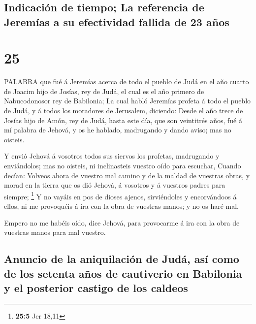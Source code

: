 \hypertarget{indicaciuxf3n-de-tiempo-la-referencia-de-jeremuxedas-a-su-efectividad-fallida-de-23-auxf1os}{%
\subsection{Indicación de tiempo; La referencia de Jeremías a su
efectividad fallida de 23
años}\label{indicaciuxf3n-de-tiempo-la-referencia-de-jeremuxedas-a-su-efectividad-fallida-de-23-auxf1os}}

\hypertarget{section-24}{%
\section{25}\label{section-24}}

 PALABRA que fué á Jeremías acerca de todo el pueblo de Judá
en el año cuarto de Joacim hijo de Josías, rey de Judá, el cual es el
año primero de Nabucodonosor rey de Babilonia;  La cual
habló Jeremías profeta á todo el pueblo de Judá, y á todos los moradores
de Jerusalem, diciendo:  Desde el año trece de Josías hijo
de Amón, rey de Judá, hasta este día, que son veintitrés años, fué á mí
palabra de Jehová, y os he hablado, madrugando y dando aviso; mas no
oisteis.

 Y envió Jehová á vosotros todos sus siervos los profetas,
madrugando y enviándolos; mas no oisteis, ni inclinasteis vuestro oído
para escuchar,  Cuando decían: Volveos ahora de vuestro mal
camino y de la maldad de vuestras obras, y morad en la tierra que os dió
Jehová, á vosotros y á vuestros padres para siempre; \footnote{\textbf{25:5}
  Jer 18,11}  Y no vayáis en pos de dioses ajenos,
sirviéndoles y encorvándoos á ellos, ni me provoquéis á ira con la obra
de vuestras manos; y no os haré mal.

 Empero no me habéis oído, dice Jehová, para provocarme á
ira con la obra de vuestras manos para mal vuestro.

\hypertarget{anuncio-de-la-aniquilaciuxf3n-de-juduxe1-asuxed-como-de-los-setenta-auxf1os-de-cautiverio-en-babilonia-y-el-posterior-castigo-de-los-caldeos}{%
\subsection{Anuncio de la aniquilación de Judá, así como de los setenta
años de cautiverio en Babilonia y el posterior castigo de los
caldeos}\label{anuncio-de-la-aniquilaciuxf3n-de-juduxe1-asuxed-como-de-los-setenta-auxf1os-de-cautiverio-en-babilonia-y-el-posterior-castigo-de-los-caldeos}}

